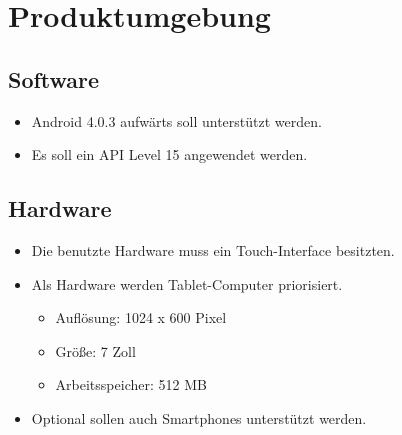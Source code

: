 \section{Produktumgebung}

\subsection{Software}
\begin{itemize}
	\item Android 4.0.3 aufwärts soll unterstützt werden.
	\item Es soll ein API Level 15 angewendet werden.
\end{itemize}
\subsection{Hardware}
\begin{itemize}
	\item Die benutzte Hardware muss ein Touch-Interface besitzten.
	\item Als Hardware werden Tablet-Computer priorisiert.
	\begin{itemize}
		\item Auflösung: 1024 x 600 Pixel
		\item Größe: 7 Zoll
		\item Arbeitsspeicher: 512 MB
	\end{itemize}
	\item Optional sollen auch Smartphones unterstützt werden.
\end{itemize}
